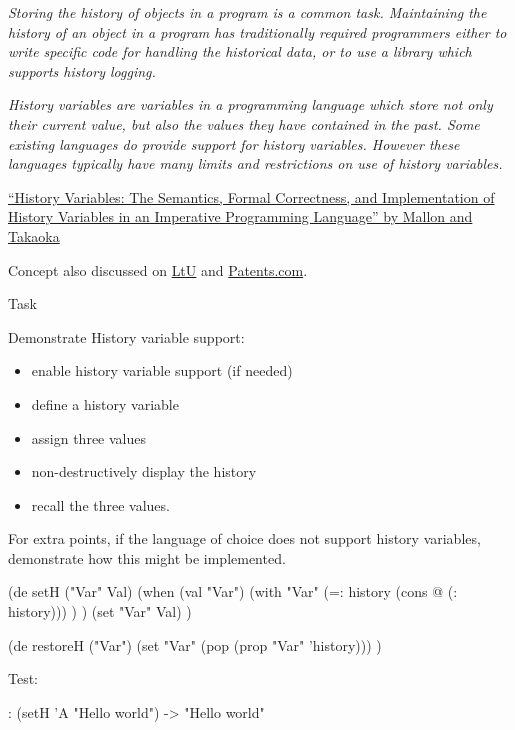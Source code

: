 \begin{itemize}
\emph{Storing the history of objects in a program is a common task.
Maintaining the history of an object in a program has traditionally
required programmers either to write specific code for handling the
historical data, or to use a library which supports history logging.}

\emph{History variables are variables in a programming language which
store not only their current value, but also the values they have
contained in the past. Some existing languages do provide support for
history variables. However these languages typically have many limits
and restrictions on use of history variables.} \emph{}

\href{http://www.bod.com/index.php?id=3435\&objk\_id=148050}{``History
Variables: The Semantics, Formal Correctness, and Implementation of
History Variables in an Imperative Programming Language'' by Mallon and
Takaoka}

Concept also discussed on
\href{http://lambda-the-ultimate.org/node/3111}{LtU} and
\href{http://www.patents.com/us-7111283.html}{Patents.com}.

\begin{description}
\item[Task]
\end{description}

Demonstrate History variable support:

\begin{itemize}
\item
  enable history variable support (if needed)
\item
  define a history variable
\item
  assign three values
\item
  non-destructively display the history
\item
  recall the three values.
\end{itemize}

For extra points, if the language of choice does not support history
variables, demonstrate how this might be implemented.


\begin{wideverbatim}

(de setH ("Var" Val)
   (when (val "Var")
      (with "Var"
         (=: history (cons @ (: history))) ) )
   (set "Var" Val) )

(de restoreH ("Var")
   (set "Var" (pop (prop "Var" 'history))) )

Test:

: (setH 'A "Hello world")
-> "Hello world"


\end{wideverbatim}
\end{itemize}
